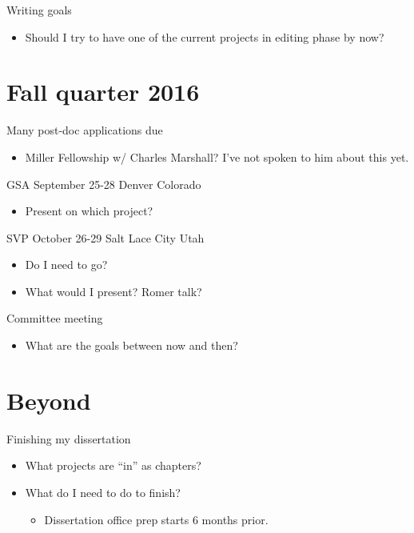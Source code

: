 \documentclass{article}
\begin{document}
Writing goals
\begin{itemize}
  \item Should I try to have one of the current projects in editing phase by now?
\end{itemize}


\section{Fall quarter 2016}
Many post-doc applications due
\begin{itemize}
  \item Miller Fellowship w/ Charles Marshall? I've not spoken to him about this yet.
\end{itemize}

GSA September 25-28 Denver Colorado
\begin{itemize}
  \item Present on which project?
\end{itemize}

SVP October 26-29 Salt Lace City Utah
\begin{itemize}
  \item Do I need to go?
  \item What would I present? Romer talk?
\end{itemize}

Committee meeting
\begin{itemize}
  \item What are the goals between now and then?
\end{itemize}


\section{Beyond}
Finishing my dissertation
\begin{itemize}
  \item What projects are ``in'' as chapters?
  \item What do I need to do to finish?
    \begin{itemize}
      \item Dissertation office prep starts 6 months prior.
    \end{itemize}
\end{itemize}
\end{document}
